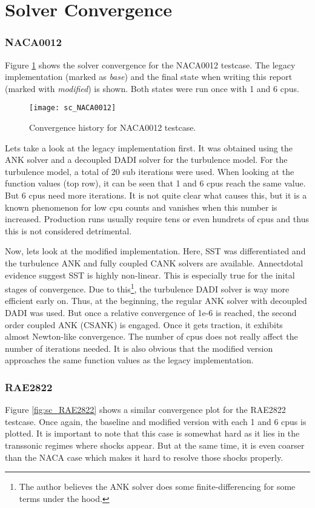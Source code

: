 \section{Solver Convergence}
\subsubsection{NACA0012}
Figure \ref{fig:sc_NACA0012} shows the solver convergence for the NACA0012
testcase. The legacy implementation (marked as \textit{base}) and the final
state when writing this report (marked with \textit{modified}) is shown. Both
states were run once with 1 and 6 cpus.

\begin{figure}[H] \centering
    \texttt{[image: sc\_NACA0012]}
    \caption{Convergence history for NACA0012 testcase.}
    \label{fig:sc_NACA0012}
\end{figure}

\noindent Lets take a look at the legacy implementation first. It was
obtained using the ANK solver and a decoupled DADI solver for the turbulence
model. For the turbulence model, a total of 20 sub iterations were used. When
looking at the function values (top row), it can be seen that 1 and 6 cpus
reach the same value. But 6 cpus need more iterations. It is not quite clear
what causes this, but it is a known phenomenon for low cpu counts and vanishes
when this number is increased. Production runs usually require tens or even
hundrets of cpus and thus this is not considered detrimental.


Now, lets look at the modified implementation. Here, SST was differentiated and
the turbulence ANK and fully coupled CANK solvers are available. Annectdotal
evidence suggest SST is highly non-linear. This is especially true for the
inital stages of convergence. Due to this\footnote{The author believes the ANK
solver does some finite-differencing for some terms under the hood.}, the
turbulence DADI solver is way more efficient early on. Thus, at the beginning,
the regular ANK solver with decoupled DADI was used. But once a relative
convergence of 1e-6 is reached, the second order coupled ANK (CSANK) is
engaged. Once it gets traction, it exhibits almost Newton-like convergence. The
number of cpus does not really affect the number of iterations needed. It is
also obvious that the modified version approaches the same function values as
the legacy implementation. 




\subsubsection{RAE2822}
Figure \ref{fig:sc_RAE2822} shows a similar convergence plot for the RAE2822
testcase. Once again, the baseline and modified version with each 1 and 6 cpus
is plotted. It is important to note that this case is somewhat hard as it lies
in the transsonic regimes where shocks appear. But at the same time, it is even
coarser than the NACA case which makes it hard to resolve those shocks properly.

